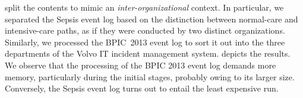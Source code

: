 split the contents to mimic an \textit{inter-organizational} context.
In particular, we separated the Sepsis event log based on the distinction between normal-care and intensive-care paths, as if they were conducted by two distinct organizations. Similarly, we processed the BPIC~2013 event log to sort it out into the three departments of the Volvo IT incident management system. %
 depicts the results. We observe that the processing of the BPIC 2013 event log demands more memory, particularly during the initial stages, probably owing to its larger size. Conversely, the Sepsis event log turns out to entail the least expensive run. %

